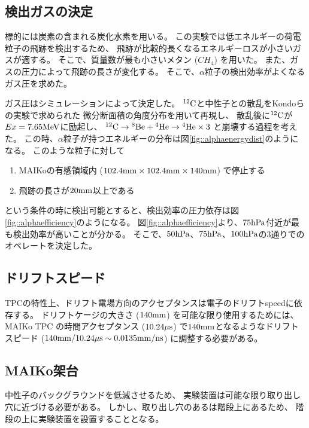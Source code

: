 \subsection{検出ガスの決定}
標的には炭素の含まれる炭化水素を用いる。
この実験では低エネルギーの荷電粒子の飛跡を検出するため、
飛跡が比較的長くなるエネルギーロスが小さいガスが適する。
そこで、質量数が最も小さいメタン ($CH_{4}$) を用いた。
また、ガスの圧力によって飛跡の長さが変化する。
そこで、$\alpha$粒子の検出効率がよくなるガス圧を求めた。

ガス圧はシミュレーションによって決定した。
${}^{12}\rm{C}$と中性子との散乱をKondoらの実験で求められた
微分断面積の角度分布を用いて再現し、
散乱後に${}^{12}\rm{C}$が$Ex = 7.65\rm{MeV}$に励起し、
${}^{12}\rm{C}\rightarrow{}^{8}\rm{Be}+{}^{4}\rm{He}\rightarrow{}^{4}\rm{He}\times 3$
と崩壊する過程を考えた。
この時、$\alpha$粒子が持つエネルギーの分布は図\ref{fig::alphaenergydist}のようになる。
このような粒子に対して
\begin{enumerate}
\item
  MAIKoの有感領域内 ($102.4\rm{mm}\times 102.4\rm{mm}\times 140\rm{mm}$) で停止する
\item
  飛跡の長さが$20\rm{mm}$以上である
\end{enumerate}
という条件の時に検出可能とすると、検出効率の圧力依存は図\ref{fig::alphaefficiency}のようになる。
図\ref{fig::alphaefficiency}より、$75\rm{hPa}$付近が最も検出効率が高いことが分かる。
そこで、$50\rm{hPa}$、$75\rm{hPa}$、$100\rm{hPa}$の3通りでのオペレートを決定した。

\subsection{ドリフトスピード}
TPCの特性上、ドリフト電場方向のアクセプタンスは電子のドリフトspeedに依存する。
ドリフトケージの大きさ ($140\rm{mm}$) を可能な限り使用するためには、
MAIKo TPC の時間アクセプタンス ($10.24\rm{\mu s}$) で$140\rm{mm}$となるようなドリフトスピード
 ($140\rm{mm}/10.24\rm{\mu s} \sim 0.0135\rm{mm/ns}$) に調整する必要がある。


\subsection{MAIKo架台}
中性子のバックグラウンドを低減させるため、
実験装置は可能な限り取り出し穴に近づける必要がある。
しかし、取り出し穴のあるは階段上にあるため、
階段の上に実験装置を設置することとなる。


